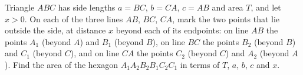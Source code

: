Triangle $ABC$ has side lengths $a=BC$, $b=CA$, $c=AB$ and area $T$, and let $x>0$. On each of the three lines $AB$, $BC$, $CA$, mark the two points that lie outside the side, at distance $x$ beyond each of its endpoints: on line $AB$ the points $A_1$ (beyond $A$) and $B_1$ (beyond $B$), on line $BC$ the points $B_2$ (beyond $B$) and $C_1$ (beyond $C$), and on line $CA$ the points $C_2$ (beyond $C$) and $A_2$ (beyond $A$). Find the area of the hexagon $A_1A_2B_2B_1C_2C_1$ in terms of $T$, $a$, $b$, $c$ and $x$.
